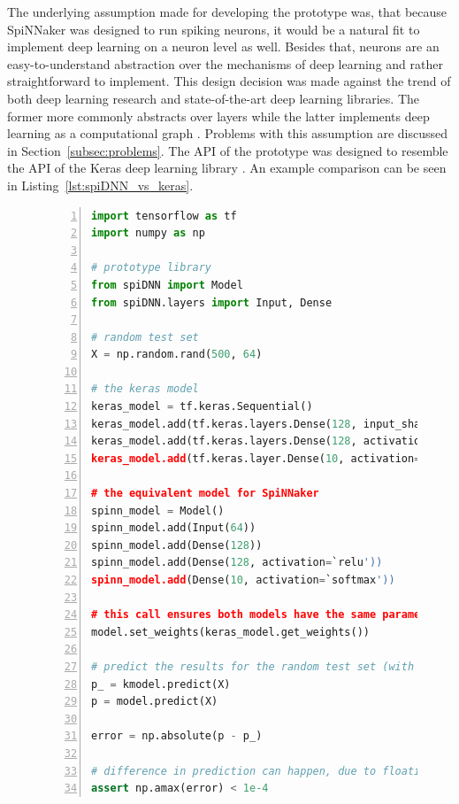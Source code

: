 \documentclass[]{article}
\begin{document}
The underlying assumption made for developing the prototype was,
that because SpiNNaker was designed to run spiking neurons, it would
be a natural fit to implement deep learning on a neuron level as well.
Besides that, neurons are an easy-to-understand abstraction over the
mechanisms of deep learning and rather straightforward to implement.
This design decision was made against the trend of both deep learning
research and state-of-the-art deep learning libraries.
The former more commonly abstracts over layers while the latter
implements deep learning as a computational graph
\citep{goodfellow_et_al_2016}.
Problems with this assumption are discussed in
Section~\ref{subsec:problems}.
The API of the prototype was designed to resemble the API of the Keras
deep learning library \citep{keras}.
An example comparison can be seen in
Listing~\ref{lst:spiDNN_vs_keras}.

\begin{figure} %
\begin{lstlisting}[language=Python, caption={Example code comparing
  inference with Keras to inference with the prototype. The code would
  result in a model akin to the one shown in
  Figure~\ref{fig:spiDNN_arch}.}, captionpos=b,
  label=lst:spiDNN_vs_keras, numbers=left]
import tensorflow as tf
import numpy as np

# prototype library
from spiDNN import Model
from spiDNN.layers import Input, Dense

# random test set
X = np.random.rand(500, 64)

# the keras model
keras_model = tf.keras.Sequential()
keras_model.add(tf.keras.layers.Dense(128, input_shape=(64,)))
keras_model.add(tf.keras.layers.Dense(128, activation=`relu'))
keras_model.add(tf.keras.layer.Dense(10, activation=`softmax'))

# the equivalent model for SpiNNaker
spinn_model = Model()
spinn_model.add(Input(64))
spinn_model.add(Dense(128))
spinn_model.add(Dense(128, activation=`relu'))
spinn_model.add(Dense(10, activation=`softmax'))

# this call ensures both models have the same parameters
model.set_weights(keras_model.get_weights())

# predict the results for the random test set (with random weights)
p_ = kmodel.predict(X)
p = model.predict(X)

error = np.absolute(p - p_)

# difference in prediction can happen, due to floating point errors
assert np.amax(error) < 1e-4
\end{lstlisting}
\end{figure} %
\end{document}
